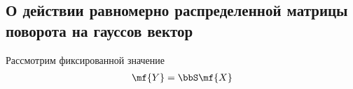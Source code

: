 \subsection{О действии равномерно распределенной матрицы поворота на гауссов вектор}

Рассмотрим фиксированной значение 
\begin{gather}
	\mf{Y} = \bbS \mf{X} \notag 
\end{gather}
